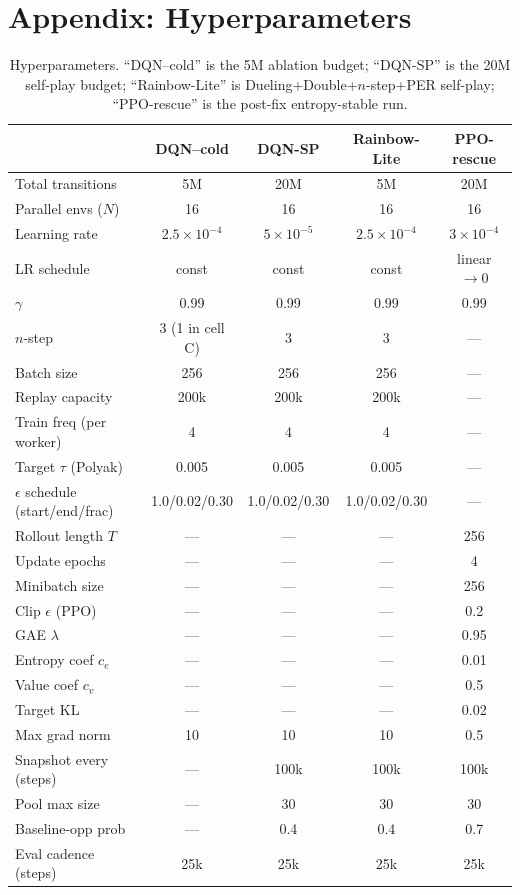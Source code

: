 \section{Appendix: Hyperparameters}
\label{app:hp}

\begin{table}[h]
\centering
\caption{Hyperparameters. ``DQN--cold'' is the 5M ablation budget; ``DQN-SP''
is the 20M self-play budget; ``Rainbow-Lite'' is Dueling+Double+$n$-step+PER
self-play; ``PPO-rescue'' is the post-fix entropy-stable run.}
\label{tab:hp}
\small
\begin{tabular}{lcccc}
\toprule
 & DQN--cold & DQN-SP & Rainbow-Lite & PPO-rescue \\
\midrule
Total transitions & 5M & 20M & 5M & 20M \\
Parallel envs ($N$) & 16 & 16 & 16 & 16 \\
Learning rate & $2.5{\times}10^{-4}$ & $5{\times}10^{-5}$ & $2.5{\times}10^{-4}$ & $3{\times}10^{-4}$ \\
LR schedule & const & const & const & linear $\to 0$ \\
$\gamma$ & 0.99 & 0.99 & 0.99 & 0.99 \\
$n$-step & 3 (1 in cell C) & 3 & 3 & --- \\
Batch size & 256 & 256 & 256 & --- \\
Replay capacity & 200k & 200k & 200k & --- \\
Train freq (per worker) & 4 & 4 & 4 & --- \\
Target $\tau$ (Polyak) & 0.005 & 0.005 & 0.005 & --- \\
$\epsilon$ schedule (start/end/frac) & 1.0/0.02/0.30 & 1.0/0.02/0.30 & 1.0/0.02/0.30 & --- \\
Rollout length $T$ & --- & --- & --- & 256 \\
Update epochs & --- & --- & --- & 4 \\
Minibatch size & --- & --- & --- & 256 \\
Clip $\epsilon$ (PPO) & --- & --- & --- & 0.2 \\
GAE $\lambda$ & --- & --- & --- & 0.95 \\
Entropy coef $c_e$ & --- & --- & --- & 0.01 \\
Value coef $c_v$ & --- & --- & --- & 0.5 \\
Target KL & --- & --- & --- & 0.02 \\
Max grad norm & 10 & 10 & 10 & 0.5 \\
Snapshot every (steps) & --- & 100k & 100k & 100k \\
Pool max size & --- & 30 & 30 & 30 \\
Baseline-opp prob & --- & 0.4 & 0.4 & 0.7 \\
Eval cadence (steps) & 25k & 25k & 25k & 25k \\
\bottomrule
\end{tabular}
\end{table}

